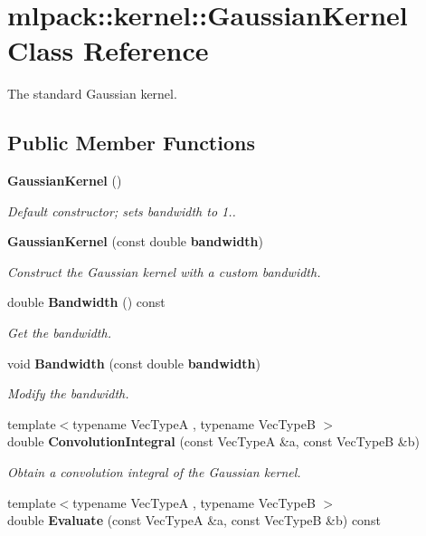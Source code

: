 \section{mlpack\+:\+:kernel\+:\+:Gaussian\+Kernel Class Reference}
\label{classmlpack_1_1kernel_1_1GaussianKernel}


The standard Gaussian kernel.  


\subsection*{Public Member Functions}
\begin{DoxyCompactItemize}
\item 
{\bf Gaussian\+Kernel} ()
\begin{DoxyCompactList}\small\item\em Default constructor; sets bandwidth to 1.. \end{DoxyCompactList}\item 
{\bf Gaussian\+Kernel} (const double {\bf bandwidth})
\begin{DoxyCompactList}\small\item\em Construct the Gaussian kernel with a custom bandwidth. \end{DoxyCompactList}\item 
double {\bf Bandwidth} () const 
\begin{DoxyCompactList}\small\item\em Get the bandwidth. \end{DoxyCompactList}\item 
void {\bf Bandwidth} (const double {\bf bandwidth})
\begin{DoxyCompactList}\small\item\em Modify the bandwidth. \end{DoxyCompactList}\item 
{\footnotesize template$<$typename Vec\+TypeA , typename Vec\+TypeB $>$ }\\double {\bf Convolution\+Integral} (const Vec\+TypeA \&a, const Vec\+TypeB \&b)
\begin{DoxyCompactList}\small\item\em Obtain a convolution integral of the Gaussian kernel. \end{DoxyCompactList}\item 
{\footnotesize template$<$typename Vec\+TypeA , typename Vec\+TypeB $>$ }\\double {\bf Evaluate} (const Vec\+TypeA \&a, const Vec\+TypeB \&b) const 

\end{DoxyCompactItemize}
